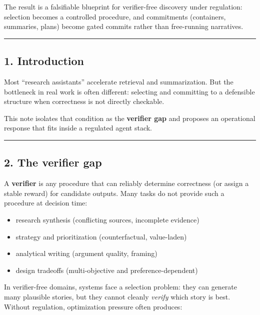 \documentclass[11pt]{article}
\providecommand{\tightlist}{%
  \setlength{\itemsep}{0pt}\setlength{\parskip}{0pt}}
\begin{document}
The result is a falsifiable blueprint for verifier-free discovery under regulation: selection becomes a controlled procedure, and commitments (containers, summaries, plans) become gated commits rather than free-running narratives.

\begin{center}\rule{0.5\linewidth}{0.5pt}\end{center}

\hypertarget{introduction}{%
\subsection{1. Introduction}\label{introduction}}

Most ``research assistants'' accelerate retrieval and summarization. But the bottleneck in real work is often different: selecting and committing to a defensible structure when correctness is not directly checkable.

This note isolates that condition as the \textbf{verifier gap} and proposes an operational response that fits inside a regulated agent stack.

\begin{center}\rule{0.5\linewidth}{0.5pt}\end{center}

\hypertarget{verifier-gap}{%
\subsection{2. The verifier gap}\label{verifier-gap}}

A \textbf{verifier} is any procedure that can reliably determine correctness (or assign a stable reward) for candidate outputs. Many tasks do not provide such a procedure at decision time:

\begin{itemize}
\tightlist
\item research synthesis (conflicting sources, incomplete evidence)
\item strategy and prioritization (counterfactual, value-laden)
\item analytical writing (argument quality, framing)
\item design tradeoffs (multi-objective and preference-dependent)
\end{itemize}

In verifier-free domains, systems face a selection problem: they can generate many plausible stories, but they cannot cleanly \emph{verify} which story is best. Without regulation, optimization pressure often produces:
\end{document}
